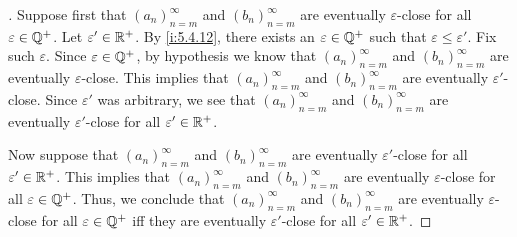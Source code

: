 \begin{proof}[]
  Suppose first that \((a_n)_{n = m}^\infty\) and \((b_n)_{n = m}^\infty\) are eventually \(\varepsilon\)-close for all \(\varepsilon \in \mathbb{Q}^+\).
  Let \(\varepsilon' \in \mathbb{R}^+\).
  By \cref{i:5.4.12}, there exists an \(\varepsilon \in \mathbb{Q}^+\) such that \(\varepsilon \leq \varepsilon'\).
  Fix such \(\varepsilon\).
  Since \(\varepsilon \in \mathbb{Q}^+\), by hypothesis we know that \((a_n)_{n = m}^\infty\) and \((b_n)_{n = m}^\infty\) are eventually \(\varepsilon\)-close.
  This implies that \((a_n)_{n = m}^\infty\) and \((b_n)_{n = m}^\infty\) are eventually \(\varepsilon'\)-close.
  Since \(\varepsilon'\) was arbitrary, we see that \((a_n)_{n = m}^\infty\) and \((b_n)_{n = m}^\infty\) are eventually \(\varepsilon'\)-close for all \(\varepsilon' \in \mathbb{R}^+\).

  Now suppose that \((a_n)_{n = m}^\infty\) and \((b_n)_{n = m}^\infty\) are eventually \(\varepsilon'\)-close for all \(\varepsilon' \in \mathbb{R}^+\).
  This implies that \((a_n)_{n = m}^\infty\) and \((b_n)_{n = m}^\infty\) are eventually \(\varepsilon\)-close for all \(\varepsilon \in \mathbb{Q}^+\).
  Thus, we conclude that \((a_n)_{n = m}^\infty\) and \((b_n)_{n = m}^\infty\) are eventually \(\varepsilon\)-close for all \(\varepsilon \in \mathbb{Q}^+\) iff they are eventually \(\varepsilon'\)-close for all \(\varepsilon' \in \mathbb{R}^+\).
\end{proof}
